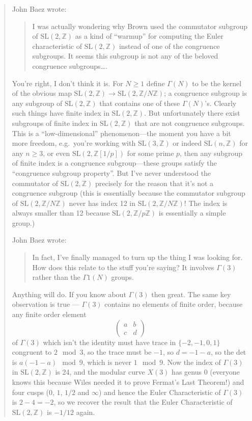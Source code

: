 \documentclass{article}
\begin{document}
\begin{quote}
John Baez wrote:

\begin{quote}
I was actually wondering why Brown used the commutator subgroup of
\(\mathrm{SL}(2,\mathbb{Z})\) as a kind of ``warmup'' for computing the
Euler characteristic of \(\mathrm{SL}(2,\mathbb{Z})\) instead of one of
the congruence subgroups. It seems this subgroup is not any of the
beloved congruence subgroups\ldots.
\end{quote}

You're right, I don't think it is. For \(N\geqslant1\) define
\(\Gamma(N)\) to be the kernel of the obvious map
\(\mathrm{SL}(2,\mathbb{Z})\to\mathrm{SL}(2,\mathbb{Z}/N\mathbb{Z})\); a
congruence subgroup is any subgroup of \(\mathrm{SL}(2,\mathbb{Z})\)
that contains one of these \(\Gamma(N)\)'s. Clearly such things have
finite index in \(\mathrm{SL}(2,\mathbb{Z})\). But unfortunately there
exist subgroups of finite index in \(\mathrm{SL}(2,\mathbb{Z})\) that
are not congruence subgroups. This is a ``low-dimensional''
phenomenon---the moment you have a bit more freedom, e.g.~you're working
with \(\mathrm{SL}(3,\mathbb{Z})\) or indeed
\(\mathrm{SL}(n,\mathbb{Z})\) for any \(n\geqslant3\), or even
\(\mathrm{SL}(2,\mathbb{Z}[1/p])\) for some prime \(p\), then any
subgroup of finite index is a congruence subgroup---these groups satisfy
the ``congruence subgroup property''. But I've never understood the
commutator of \(\mathrm{SL}(2,\mathbb{Z})\) precisely for the reason
that it's not a congruence subgroup (this is essentially because the
commutator subgroup of \(\mathrm{SL}(2,\mathbb{Z}/N\mathbb{Z})\) never
has index 12 in \(\mathrm{SL}(2,\mathbb{Z}/N\mathbb{Z})\)! The index is
always smaller than 12 because \(\mathrm{SL}(2,\mathbb{Z}/p\mathbb{Z})\)
is essentially a simple group.)

John Baez wrote:

\begin{quote}
In fact, I've finally managed to turn up the thing I was looking for.
How does this relate to the stuff you're saying? It involves
\(\Gamma(3)\) rather than the \(\Gamma1(N)\) groups.
\end{quote}

Anything will do. If you know about \(\Gamma(3)\) then great. The same
key observation is true --- \(\Gamma(3)\) contains no elements of finite
order, because any finite order element
\[\left(\begin{array}{cc}a&b\\c&d\end{array}\right)\] of \(\Gamma(3)\)
which isn't the identity must have trace in \(\{-2,-1,0,1\}\) congruent
to \(2 \mod 3\), so the trace must be \(-1\), so \(d=-1-a\), so the det
is \(a(-1-a) \mod 9\), which is never \(1 \mod 9\). Now the index of
\(\Gamma(3)\) in \(\mathrm{SL}(2,\mathbb{Z})\) is 24, and the modular
curve \(X(3)\) has genus 0 (everyone knows this because Wiles needed it
to prove Fermat's Last Theorem!) and four cusps (\(0\), \(1\), \(1/2\)
and \(\infty\)) and hence the Euler Characteristic of \(\Gamma(3)\) is
\(2-4=-2\), so we recover the result that the Euler Characteristic of
\(\mathrm{SL}(2,\mathbb{Z})\) is \(-1/12\) again.


\end{quote}
\end{document}

